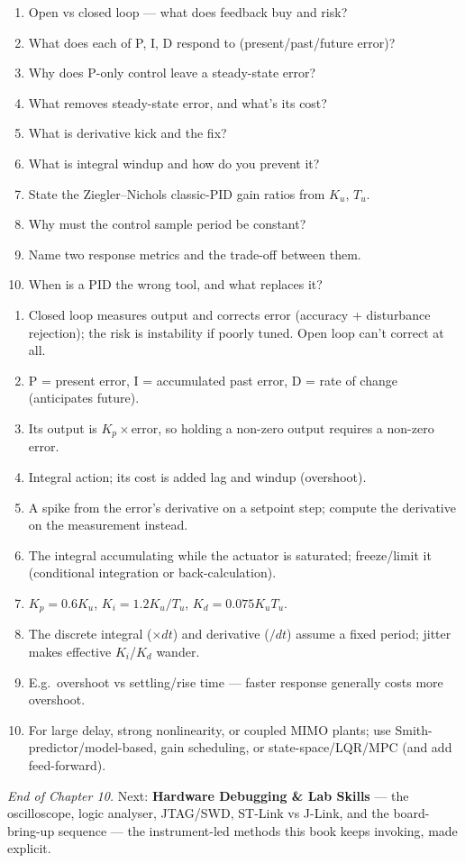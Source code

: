 \begin{scorecard}
\begin{enumerate}
\item Open vs closed loop --- what does feedback buy and risk?
\item What does each of P, I, D respond to (present/past/future error)?
\item Why does P-only control leave a steady-state error?
\item What removes steady-state error, and what's its cost?
\item What is derivative kick and the fix?
\item What is integral windup and how do you prevent it?
\item State the Ziegler--Nichols classic-PID gain ratios from $K_u$, $T_u$.
\item Why must the control sample period be constant?
\item Name two response metrics and the trade-off between them.
\item When is a PID the wrong tool, and what replaces it?
\end{enumerate}
\end{scorecard}

\begin{answerkey}
\begin{enumerate}
\item Closed loop measures output and corrects error (accuracy + disturbance
  rejection); the risk is instability if poorly tuned. Open loop can't correct
  at all.
\item P = present error, I = accumulated past error, D = rate of change
  (anticipates future).
\item Its output is $K_p\times$error, so holding a non-zero output requires a
  non-zero error.
\item Integral action; its cost is added lag and windup (overshoot).
\item A spike from the error's derivative on a setpoint step; compute the
  derivative on the measurement instead.
\item The integral accumulating while the actuator is saturated; freeze/limit
  it (conditional integration or back-calculation).
\item $K_p=0.6K_u$, $K_i=1.2K_u/T_u$, $K_d=0.075K_uT_u$.
\item The discrete integral ($\times dt$) and derivative ($/dt$) assume a fixed
  period; jitter makes effective $K_i$/$K_d$ wander.
\item E.g.\ overshoot vs settling/rise time --- faster response generally costs
  more overshoot.
\item For large delay, strong nonlinearity, or coupled MIMO plants; use
  Smith-predictor/model-based, gain scheduling, or state-space/LQR/MPC (and add
  feed-forward).
\end{enumerate}
\end{answerkey}

\begin{partnote}
\emph{End of Chapter 10.} Next: \textbf{Hardware Debugging \& Lab Skills} ---
the oscilloscope, logic analyser, JTAG/SWD, ST-Link vs J-Link, and the
board-bring-up sequence --- the instrument-led methods this book keeps invoking,
made explicit.
\end{partnote}

